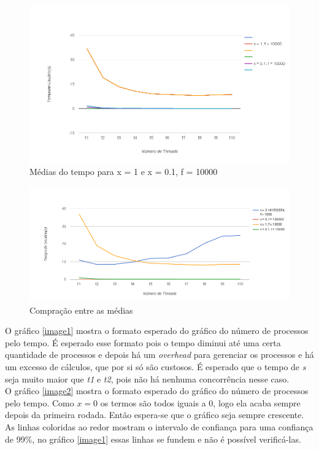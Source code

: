 \documentclass[paper=a4, fontsize=11pt]{scrartcl}
\numberwithin{equation}{section}		%
\numberwithin{figure}{section}			%
\numberwithin{table}{section}				%
\begin{document}
\begin{figure}[H]
	\centering
	\includegraphics[width=\textwidth]{image3}
	\caption{Médias do tempo para x = 1 e x = 0.1, f = 10000}
	\label{image3}
\end{figure}

\begin{figure}[H]
	\centering
	\includegraphics[width=\textwidth]{image4}
	\caption{Compração entre as médias}
	\label{image4}
\end{figure}

O gráfico \ref{image1} mostra o formato esperado do gráfico do número de processos pelo tempo. É esperado esse formato pois o tempo diminui até uma certa quantidade de processos e depois há um \textit{overhead} para gerenciar os processos e há um excesso de cálculos, que por si só são custosos. É esperado que o tempo de \textit{s} seja muito maior que \textit{t1} e \textit{t2}, pois não há nenhuma concorrência nesse caso.\\

O gráfico \ref{image2} mostra o formato esperado do gráfico do número de processos pelo tempo. Como $x = 0$ os termos são todos iguais a 0, logo ela acaba sempre depois da primeira rodada. Então espera-se que o gráfico seja sempre crescente. As linhas coloridas ao redor mostram o intervalo de confiança para uma confiança de 99\%, no gráfico \ref{image1} essas linhas se fundem e não é possível verificá-las.\\
\end{document}
